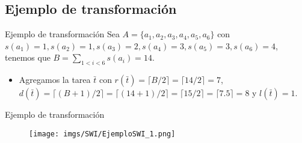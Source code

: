\renewcommand{\subsectiontitle}{Ejemplo de transformación}
\subsection{\subsectiontitle}

\begin{frame}{\subsectiontitle}
    Sea $A=\{a_1,a_2,a_3,a_4,a_5,a_6\}$ con $s(a_1)=1,s(a_2)=1,s(a_3)=2,s(a_4)=3,s(a_5)=3,s(a_6)=4$, tenemos que $B=\sum_{1<i<6} s(a_i) = 14$.
    \begin{itemize}
        \itemj Asignamos los valores $r(t_a)=0, d(t_a)=B+1, l(t_a)=s(a)$ para cada $a\in A$:
        
        \vspace{10pt}
        \begin{itemize}
            \item $r(t_{a_1})=0,$ \hspace{5pt} $d(t_{a_1})=B+1=15,$ \hspace{5pt} $l(t_{a_1})=s(a_1)=1$
            \item $r(t_{a_2})=0,$ \hspace{5pt} $d(t_{a_2})=B+1=15,$ \hspace{5pt} $l(t_{a_2})=s(a_2)=1$
            \item $r(t_{a_3})=0,$ \hspace{5pt} $d(t_{a_3})=B+1=15,$ \hspace{5pt} $l(t_{a_3})=s(a_3)=2$
            \item $r(t_{a_4})=0,$ \hspace{5pt} $d(t_{a_4})=B+1=15,$ \hspace{5pt} $l(t_{a_4})=s(a_4)=3$
            \item $r(t_{a_5})=0,$ \hspace{5pt} $d(t_{a_5})=B+1=15,$ \hspace{5pt} $l(t_{a_5})=s(a_5)=3$
            \item $r(t_{a_6})=0,$ \hspace{5pt} $d(t_{a_6})=B+1=15,$ \hspace{5pt} $l(t_{a_6})=s(a_6)=4$
        \end{itemize}

        \item Agregamos la tarea $\bar{t}$  con $r(\bar{t})= \lceil B/2\rceil = \lceil 14/2\rceil = 7$, $d(\bar{t})=\lceil (B+1)/2\rceil=\lceil (14+1)/2\rceil=\lceil 15/2\rceil=\lceil 7.5\rceil = 8$ y $l(\bar{t})=1$.
    \end{itemize}
\end{frame}
\begin{frame}{\subsectiontitle}
    \begin{figure}
    \centering
        \texttt{[image: imgs/SWI/EjemploSWI\_1.png]}
    \end{figure}
\end{frame}

